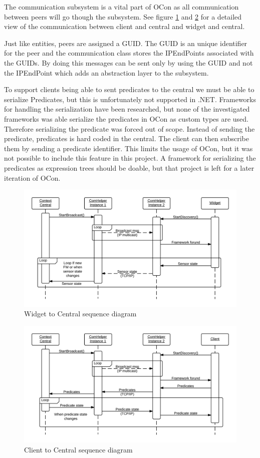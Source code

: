 \documentclass[../report.tex]{subfiles}
\begin{document}
The communication subsystem is a vital part of OCon as all communication between peers will go though the subsystem. See figure \ref{fig:widgetComHelper} and \ref{fig:clientComHelper} for a detailed view of the communication between client and central and widget and central.

Just like entities, peers are assigned a GUID. The GUID is an unique identifier for the peer and the communication class stores the IPEndPoints associated with the GUIDs. By doing this messages can be sent only by using the GUID and not the IPEndPoint which adds an abstraction layer to the subsystem.

To support clients being able to sent predicates to the central we must be able to serialize Predicates, but this is unfortunately not supported in .NET. Frameworks for handling the serialization have been researched, but none of the investigated frameworks was able serialize the predicates in OCon as custom types are used. Therefore serializing the predicate was forced out of scope. Instead of sending the predicate, predicates is hard coded in the central. The client can then subscribe them by sending a predicate identifier. This limits the usage of OCon, but it was not possible to include this feature in this project. A framework for serializing the predicates as expression trees should be doable, but that project is left for a later iteration of OCon.

\begin{figure}
\centering
\includegraphics[width=\linewidth]{comHelperSequence-widget.png}
\caption{Widget to Central sequence diagram}
\label{fig:widgetComHelper}
\end{figure}

\begin{figure}
\centering
\includegraphics[width=\linewidth]{comHelperSequence-client.png}
\caption{Client to Central sequence diagram}
\label{fig:clientComHelper}
\end{figure}
\end{document}
